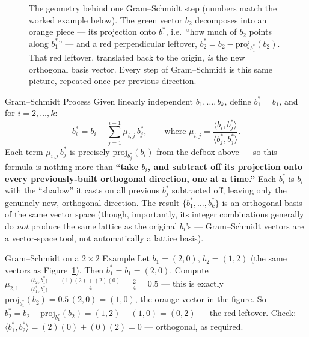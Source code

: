 \begin{figure}[h]
\centering
{}
\caption{The geometry behind one Gram--Schmidt step (numbers match the worked example below). The green vector $b_2$ decomposes into an orange piece --- its projection onto $b_1^*$, i.e.\ ``how much of $b_2$ points along $b_1^*$'' --- and a red perpendicular leftover, $b_2^* = b_2 - \mathrm{proj}_{b_1^*}(b_2)$. That red leftover, translated back to the origin, \emph{is} the new orthogonal basis vector. Every step of Gram--Schmidt is this same picture, repeated once per previous direction.}
\label{fig:gram-schmidt-projection}
\end{figure}

\begin{defbox}{Gram--Schmidt Process}
Given linearly independent $b_1,\ldots,b_k$, define $b_1^* = b_1$, and for $i = 2,\ldots,k$:
$$
b_i^* = b_i - \sum_{j=1}^{i-1} \mu_{i,j}\, b_j^*, \qquad \text{where } \mu_{i,j} = \frac{\langle b_i, b_j^* \rangle}{\langle b_j^*, b_j^* \rangle}.
$$
Each term $\mu_{i,j}\,b_j^*$ is precisely $\mathrm{proj}_{b_j^*}(b_i)$ from the defbox above --- so this formula is nothing more than \textbf{``take $b_i$, and subtract off its projection onto every previously-built orthogonal direction, one at a time.''} Each $b_i^*$ is $b_i$ with the ``shadow'' it casts on all previous $b_j^*$ subtracted off, leaving only the genuinely new, orthogonal direction. The result $\{b_1^*,\ldots,b_k^*\}$ is an orthogonal basis of the same vector space (though, importantly, its integer combinations generally do \emph{not} produce the same lattice as the original $b_i$'s --- Gram--Schmidt vectors are a vector-space tool, not automatically a lattice basis).
\end{defbox}

\begin{exbox}{Gram--Schmidt on a $2 \times 2$ Example}
Let $b_1 = (2,0)$, $b_2 = (1,2)$ (the same vectors as Figure~\ref{fig:gram-schmidt-projection}). Then $b_1^* = b_1 = (2,0)$. Compute $\mu_{2,1} = \frac{\langle b_2,b_1^*\rangle}{\langle b_1^*,b_1^*\rangle} = \frac{(1)(2)+(2)(0)}{4} = \frac{2}{4} = 0.5$ --- this is exactly $\mathrm{proj}_{b_1^*}(b_2) = 0.5\,(2,0) = (1,0)$, the orange vector in the figure. So $b_2^* = b_2 - \mathrm{proj}_{b_1^*}(b_2) = (1,2) - (1,0) = (0,2)$ --- the red leftover. Check: $\langle b_1^*, b_2^* \rangle = (2)(0)+(0)(2) = 0$ --- orthogonal, as required.
\end{exbox}


